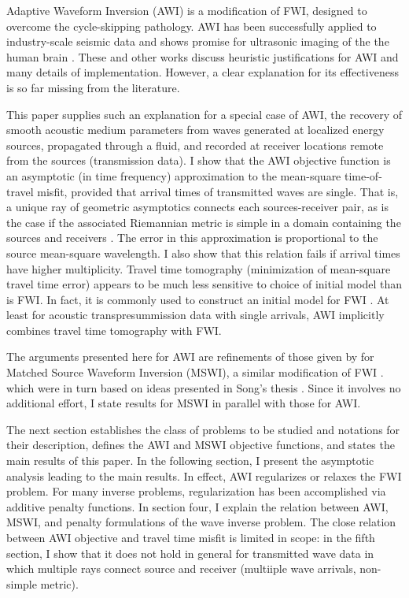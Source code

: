 Adaptive Waveform
Inversion \cite[]{Warner:16} (AWI) is a modification of FWI, designed to overcome the
cycle-skipping pathology. AWI has been successfully applied to
industry-scale seismic data
\cite[]{GuaschWarnerRavaut:GEO19,Warneretal:SEG21} and shows promise
for ultrasonic imaging of the the human brain
\cite[]{Guaschetal:NPJDM20}. These and other works discuss heuristic justifications for AWI
and many details of implementation. However, a clear explanation for its
effectiveness is so far missing from the literature.

This paper supplies such an explanation for a special case of AWI, the
recovery of smooth acoustic medium parameters from waves generated at
localized energy sources, propagated through a fluid, and recorded at
receiver locations remote from the sources (transmission data). I show that the AWI
objective function is an asymptotic (in time frequency) approximation
to the mean-square time-of-travel misfit, provided that arrival times
of transmitted waves are single. That is, a unique ray of geometric
asymptotics connects each sources-receiver pair, as is the case if the associated
Riemannian metric is simple in a domain containing the sources and
receivers \cite[]{PestovUhlmann:05,StefanovUhlmann:05}. The error in
this approximation is proportional to the source mean-square
wavelength. I also show that this relation fails if arrival times have
higher multiplicity. Travel time tomography (minimization of
mean-square travel time error) appears to be much less sensitive to
choice of initial model than is FWI. In fact, it is commonly used to
construct an initial model for FWI
\cite[]{Bordingetal:87,SirguePratt:04,VirieuxOperto:09}. At least for
acoustic transpresummission data with single arrivals, AWI implicitly
combines travel time tomography with FWI.

The arguments presented here for AWI are refinements of those given by
\cite{HuangSymes:Geo17} for Matched Source Waveform Inversion (MSWI),
a similar modification of FWI
\cite[]{HuangSymes2015SEG,HuangSymes:Geo17}. which were in turn based
on ideas presented in Song's thesis \cite[]{Song:94}. Since it
involves no additional effort, I state results for MSWI in parallel
with those for AWI.

The next section establishes the class of problems to be studied and notations
for their description, defines the AWI and MSWI objective functions,
and states the main results of this paper. In the following section, I present the
asymptotic analysis leading to the main results. In
effect, AWI regularizes or relaxes the FWI problem. For many inverse
problems, regularization has been accomplished via additive penalty
functions. In section four, I explain the relation between AWI, MSWI, and 
penalty formulations of the wave inverse problem. The close relation
between AWI objective and travel time misfit is limited in scope: in
the fifth section, I show that it does not hold in general for
transmitted wave data in which multiple rays connect source and
receiver (multiiple wave arrivals, non-simple metric).

